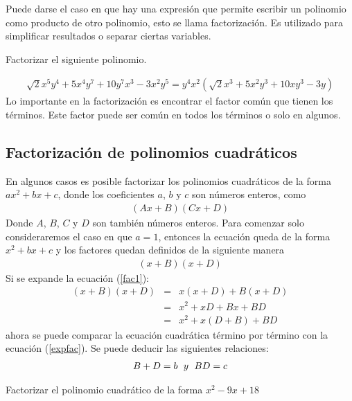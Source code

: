 Puede darse el caso en que hay una expresión que permite escribir un polinomio como producto de otro polinomio, esto se llama factorización. Es utilizado para simplificar resultados o separar ciertas variables. 

\begin{myexample}
Factorizar el siguiente polinomio.
\end{myexample}
\begin{eqnarray*}
\sqrt{2}x^{5}y^{4}+5x^{4}y^{7}+10y^{7}x^{3}-3x^{2}y^{5}=y^{4}x^{2}(\sqrt{2}x^{3}+5x^{2}y^{3}+10xy^{3}-3y)
\end{eqnarray*}
Lo importante en la factorización es encontrar el factor común que tienen los términos. Este factor puede ser común en todos los términos o solo en algunos.\\

\subsection{Factorización de polinomios cuadráticos}
\label{factor0}
En algunos casos es posible factorizar los polinomios cuadráticos de la forma $ax^{2}+bx+c$, donde los coeficientes $a$, $b$ y $c$ son números enteros, como 
\begin{eqnarray}
(Ax+B)(Cx+D) \label{fac0}
\end{eqnarray}
Donde $A$, $B$, $C$ y $D$ son también números enteros. Para comenzar solo consideraremos el caso en que $a=1$, entonces la ecuación queda de la forma $x^{2}+bx+c$ y los factores quedan definidos de la siguiente manera\\
\begin{eqnarray}
(x+B)(x+D) \label{fac1}
\end{eqnarray}
Si se expande la ecuación (\ref{fac1}):\\
\begin{eqnarray}
(x+B)(x+D)&=& x(x+D)+B(x+D)\nonumber\\
&=&x^{2}+xD+Bx+BD \nonumber\\
&=&x^{2}+x(D+B)+BD \label{expfac}
\end{eqnarray}
ahora se puede comparar la ecuación cuadrática término por término con la ecuación (\ref{expfac}). Se puede deducir las siguientes relaciones:
\begin{eqnarray*}
B+D=b \hspace{6px}y \hspace{6px}BD=c 
\end{eqnarray*}
\begin{myexample}
Factorizar el polinomio cuadrático de la forma $x^{2}-9x+18$
\end{myexample}

